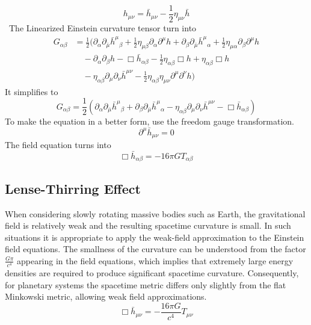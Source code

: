 \documentclass[12pt, a4paper]{article}
\theoremstyle{plain}
\theoremstyle{definition}
\theoremstyle{remark}
\begin{document}
\begin{equation}
    h_{\mu\nu} = \bar{h}_{\mu\nu} - \frac{1}{2}\eta_{\mu\nu}\bar{h}
    \label{eq:hii}
\end{equation}
\
The Linearized Einstein curvature tensor turn into
\begin{equation}
\begin{aligned}
G_{\alpha\beta} &= \frac{1}{2}(\partial_\alpha \partial_{\bar{\mu}} \bar{h}^{\mu}{}_{\beta} + \frac{1}{2}\eta_{\mu\beta}\partial_\alpha \partial^\mu h + \partial_\beta \partial_{\bar{\mu}} \bar{h}^{\mu}{}_{\alpha} + \frac{1}{2}\eta_{\mu\alpha}\partial_\beta \partial^\mu h \\
&\quad - \partial_\alpha \partial_\beta h - \Box \bar{h}_{\alpha\beta} - \frac{1}{2}\eta_{\alpha\beta}\Box h + \eta_{\alpha\beta}\Box h \\
&\quad - \eta_{\alpha\beta}\partial_\mu \partial_\nu \bar{h}^{\mu\nu} - \frac{1}{2}\eta_{\alpha\beta}\eta_{\mu\nu}\partial^\mu \partial^\nu h)
\end{aligned}
\end{equation}
It simplifies to 
\begin{equation}
G_{\alpha\beta} = \frac{1}{2}(\partial_\alpha\partial_{\bar{\mu}}\bar{h}^{\mu}{}_{\beta} + \partial_\beta\partial_{\bar{\mu}}\bar{h}^{\mu}{}_{\alpha} - \eta_{\alpha\beta}\partial_\mu\partial_\nu\bar{h}^{\mu\nu} - \Box\bar{h}_{\alpha\beta})
\end{equation}
To make the equation in a better form, use the freedom gauge transformation.  
\begin{equation}
    \partial^\mu \bar h_{\mu \nu}=0
\end{equation}
The field equation turns into
\begin{equation}
    \Box{\bar h_{\alpha \beta}}=-16\pi GT_{\alpha \beta}
\end{equation}
\subsection{Lense-Thirring Effect}
When considering slowly rotating massive bodies such as Earth, the gravitational field is relatively weak and the resulting spacetime curvature is small. In such situations it is appropriate to apply the weak-field approximation to the Einstein field equations. The smallness of the curvature can be understood from the factor $\frac{G\pi}{c^4}$ appearing in the field equations, which implies that extremely large energy densities are required to produce significant spacetime curvature. Consequently, for planetary systems the spacetime metric differs only slightly from the flat Minkowski metric, allowing weak field approximations. 
\begin{equation}
    \Box \bar{h}_{\mu\nu} = -\frac{16\pi G }{c^4}T_{\mu\nu}
\end{equation}
\end{document}
